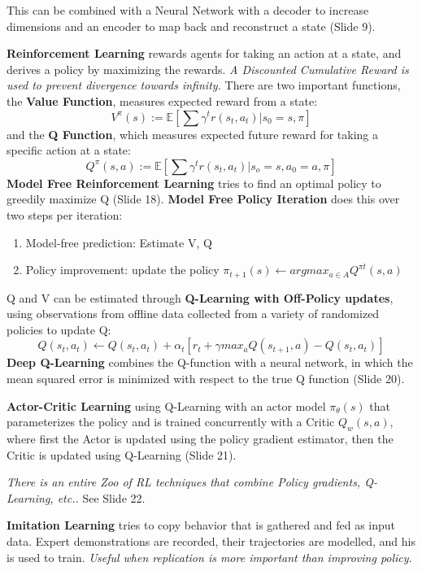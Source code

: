 \documentclass[onecolumn,a4paper]{article}
\begin{document}
This can be combined with a Neural Network with a decoder to increase dimensions and an encoder to map back and reconstruct a state (Slide 9).

\textbf{Reinforcement Learning} rewards agents for taking an action at a state, and derives a policy by maximizing the rewards. \emph{A Discounted Cumulative Reward is used to prevent divergence towards infinity.} There are two important functions, the \textbf{Value Function}, measures expected reward from a state:
\begin{equation}
    V^\pi(s):=\mathbb{E}[\sum\gamma^tr(s_t,a_t)|s_0=s,\pi]
\end{equation}
and the \textbf{Q Function}, which measures expected future reward for taking a specific action at a state:
\begin{equation}
    Q^\pi(s,a):=\mathbb{E}[\sum\gamma^tr(s_t,a_t)|s_o=s,a_0=a,\pi]
\end{equation}
\textbf{Model Free Reinforcement Learning} tries to find an optimal policy to greedily maximize Q (Slide 18). \textbf{Model Free Policy Iteration} does this over two steps per iteration:
\begin{enumerate}
    \item Model-free prediction: Estimate V, Q
    \item Policy improvement: update the policy $\pi_{t+1}(s)\leftarrow argmax_{a\in A}Q^{\pi t}(s, a)$
\end{enumerate}
Q and V can be estimated through \textbf{Q-Learning with Off-Policy updates}, using observations from offline data collected from a variety of randomized policies to update Q:
\begin{equation}
    Q(s_t, a_t) \leftarrow Q(s_t, a_t)+\alpha_t[r_t+\gamma max_aQ(s_{t+1},a)-Q(s_t,a_t)]
\end{equation}
\textbf{Deep Q-Learning} combines the Q-function with a neural network, in which the mean squared error is minimized with respect to the true Q function (Slide 20).

\textbf{Actor-Critic Learning} using Q-Learning with an actor model $\pi_\theta(s)$ that parameterizes the policy and is trained concurrently with a Critic $Q_w(s,a)$, where first the Actor is updated  using the policy gradient estimator, then the Critic is updated using Q-Learning (Slide 21).

\emph{There is an entire Zoo of RL techniques that combine Policy gradients, Q-Learning, etc..} See Slide 22.

\textbf{Imitation Learning} tries to copy behavior that is gathered and fed as input data. Expert demonstrations are recorded, their trajectories are modelled, and his is used to train. \emph{Useful when replication is more important than improving policy}.
\end{document}
